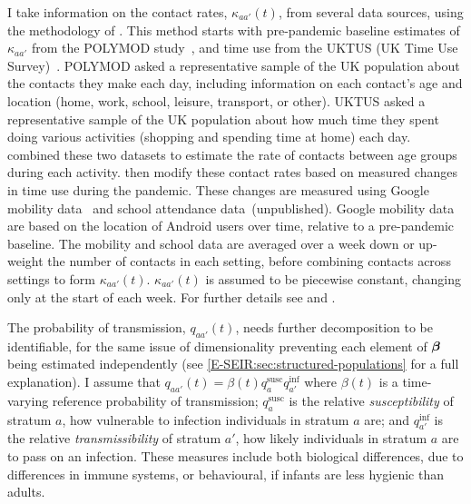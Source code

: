 \documentclass[thesis.tex]{subfiles}
\begin{document}
I take information on the contact rates, $\kappa_{aa'}(t)$, from several data sources, using the methodology of \textcite{vanleeuwenTime,vanleeuwenAugmenting}.
This method starts with pre-pandemic baseline estimates of $\kappa_{aa'}$ from the POLYMOD study~\autocite{mossongSocial}, and time use from the UKTUS (UK Time Use Survey)~\autocite{UKTUS}.
POLYMOD asked a representative sample of the UK population about the contacts they make each day, including information on each contact's age and location (home, work, school, leisure, transport, or other).
UKTUS asked a representative sample of the UK population about how much time they spent doing various activities (\eg shopping and spending time at home) each day.
\Textcite{vanleeuwenAugmenting} combined these two datasets to estimate the rate of contacts between age groups during each activity.
\Textcite{birrellRealtime} then modify these contact rates based on measured changes in time use during the pandemic.
These changes are measured using Google mobility data~\autocite{googleCOVID19} and school attendance data~(unpublished).
Google mobility data are based on the location of Android users over time, relative to a pre-pandemic baseline.
The mobility and school data are averaged over a week down or up-weight the number of contacts in each setting, before combining contacts across settings to form $\kappa_{aa'}(t)$.
$\kappa_{aa'}(t)$ is assumed to be piecewise constant, changing only at the start of each week.
For further details see \textcite{vanleeuwenAugmenting} and \textcite[supplementary material]{birrellRealtime}.

The probability of transmission, $q_{aa'}(t)$, needs further decomposition to be identifiable, for the same issue of dimensionality preventing each element of $\bm{\beta}$ being estimated independently (see \cref{E-SEIR:sec:structured-populations} for a full explanation).
I assume that $q_{aa'}(t) = \beta(t) q^\text{susc}_{a} q^\text{inf}_{a'}$ where $\beta(t)$ is a time-varying reference probability of transmission; $q^\text{susc}_a$ is the relative \emph{susceptibility} of stratum $a$, \ie how vulnerable to infection individuals in stratum $a$ are; and $q^\text{inf}_{a'}$ is the relative \emph{transmissibility} of stratum $a'$, \ie how likely individuals in stratum $a$ are to pass on an infection.
These measures include both biological differences, \eg due to differences in immune systems, or behavioural, \eg if infants are less hygienic than adults.
\end{document}

